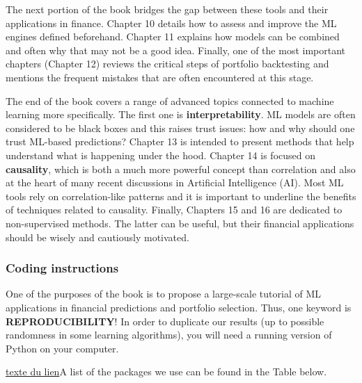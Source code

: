 The next portion of the book bridges the gap between these tools and their applications in finance. Chapter 10 details how to assess and improve the ML engines defined beforehand. Chapter 11 explains how models can be combined and often why that may not be a good idea. Finally, one of the most important chapters (Chapter 12) reviews the critical steps of portfolio backtesting and mentions the frequent mistakes that are often encountered at this stage.

The end of the book covers a range of advanced topics connected to machine learning more specifically. The first one is \textbf{interpretability}. ML models are often considered to be black boxes and this raises trust issues: how and why should one trust ML-based predictions? Chapter 13 is intended to present methods that help understand what is happening under the hood. Chapter 14 is focused on \textbf{causality}, which is both a much more powerful concept than correlation and also at the heart of many recent discussions in Artificial Intelligence (AI). Most ML tools rely on correlation-like patterns and it is important to underline the benefits of techniques related to causality. Finally, Chapters 15 and 16 are dedicated to non-supervised methods. The latter can be useful, but their financial applications should be wisely and cautiously motivated.

\subsubsection{Coding instructions}

One of the purposes of the book is to propose a large-scale tutorial of ML applications in financial predictions and portfolio selection. Thus, one keyword is \textbf{REPRODUCIBILITY}! In order to duplicate our results (up to possible randomness in some learning algorithms), you will need a running version of Python on your computer.

\href{https://}{texte du lien}A list of the packages we use can be found in the Table below.

